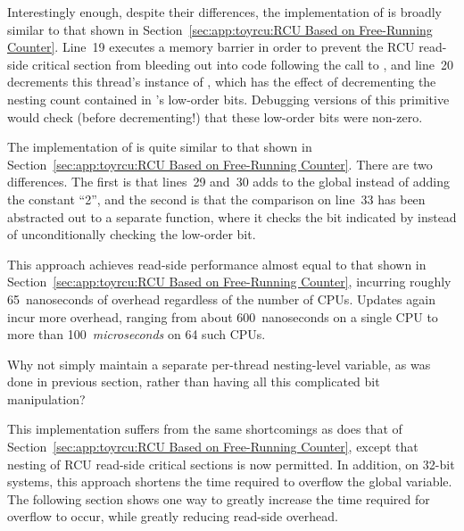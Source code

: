 Interestingly enough, despite their  differences,
the implementation of 
is broadly similar to that shown in
Section~\ref{sec:app:toyrcu:RCU Based on Free-Running Counter}.
Line~19 executes a memory barrier in order to prevent the RCU read-side
critical section from bleeding out into code following the call
to , and
line~20 decrements this thread's instance of ,
which has the effect of decrementing the nesting count contained in
's low-order bits.
Debugging versions of this primitive would check (before decrementing!)
that these low-order bits were non-zero.

The implementation of  is quite similar to
that shown in
Section~\ref{sec:app:toyrcu:RCU Based on Free-Running Counter}.
There are two differences.
The first is that lines~29 and~30 adds 
to the global  instead of adding the constant ``2'',
and the second is that the comparison on line~33 has been abstracted
out to a separate function, where it checks the bit indicated
by  instead of unconditionally checking
the low-order bit.

This approach achieves read-side performance almost equal to that
shown in
Section~\ref{sec:app:toyrcu:RCU Based on Free-Running Counter}, incurring
roughly 65~nanoseconds of overhead regardless of the number of
 CPUs.
Updates again incur more overhead, ranging from about 600~nanoseconds on
a single  CPU to more than 100~\emph{microseconds} on 64
such CPUs.

\QuickQuiz{}
	Why not simply maintain a separate per-thread nesting-level
	variable, as was done in previous section, rather than having
	all this complicated bit manipulation?
 \QuickQuizEnd

This implementation suffers from the same shortcomings as does that of
Section~\ref{sec:app:toyrcu:RCU Based on Free-Running Counter}, except that
nesting of RCU read-side critical sections is now permitted.
In addition, on 32-bit systems, this approach shortens the time
required to overflow the global  variable.
The following section shows one way to greatly increase the time
required for overflow to occur, while greatly reducing read-side
overhead.

